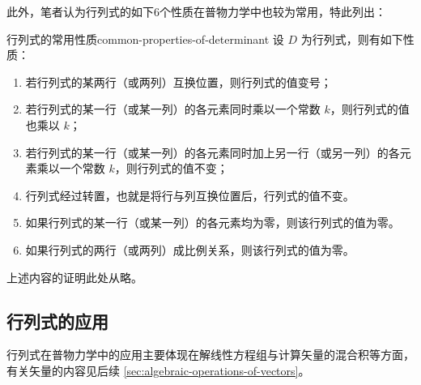 此外，笔者认为行列式的如下6个性质在普物力学中也较为常用，特此列出：
\begin{theorem}{行列式的常用性质}{common-properties-of-determinant}
    设 $ D $ 为行列式，则有如下性质：
    \begin{enumerate}
        \item 若行列式的某两行（或两列）互换位置，则行列式的值变号；
        \item 若行列式的某一行（或某一列）的各元素同时乘以一个常数 $ k $，则行列式的值也乘以 $ k $；
        \item 若行列式的某一行（或某一列）的各元素同时加上另一行（或另一列）的各元素乘以一个常数 $ k $，则行列式的值不变；
        \item 行列式经过转置，也就是将行与列互换位置后，行列式的值不变。
        \item 如果行列式的某一行（或某一列）的各元素均为零，则该行列式的值为零。
        \item 如果行列式的两行（或两列）成比例关系，则该行列式的值为零。
    \end{enumerate}
\end{theorem}

上述内容的证明此处从略。

\subsection{行列式的应用}\label{subsec:applications-of-determinant}

行列式在普物力学中的应用主要体现在解线性方程组与计算矢量的混合积等方面，有关矢量的内容见后续 \cref{sec:algebraic-operations-of-vectors}。


